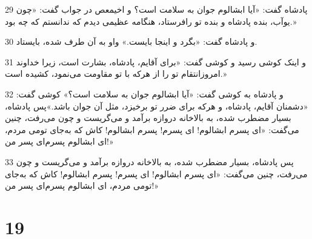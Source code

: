 \par 29 پادشاه گفت: «آیا ابشالوم جوان به سلامت است؟ و اخیمعص در جواب گفت: «چون یوآب، بنده پادشاه و بنده تو رافرستاد، هنگامه عظیمی دیدم که ندانستم که چه بود.»
\par 30 و پادشاه گفت: «بگرد و اینجا بایست.» واو به آن طرف شده، بایستاد.
\par 31 و اینک کوشی رسید و کوشی گفت: «برای آقایم، پادشاه، بشارت است، زیرا خداوند امروزانتقام تو را از هر‌که با تو مقاومت می‌نمود، کشیده است.»
\par 32 و پادشاه به کوشی گفت: «آیا ابشالوم جوان به سلامت است؟» کوشی گفت: «دشمنان آقایم، پادشاه، و هر‌که برای ضرر تو برخیزد، مثل آن جوان باشد.»پس پادشاه، بسیار مضطرب شده، به بالاخانه دروازه برآمد و می‌گریست و چون می‌رفت، چنین می‌گفت: «ای پسرم ابشالوم! ای پسرم! پسرم ابشالوم! کاش که به‌جای تومی مردم، ای ابشالوم پسرم‌ای پسر من!»
\par 33 پس پادشاه، بسیار مضطرب شده، به بالاخانه دروازه برآمد و می‌گریست و چون می‌رفت، چنین می‌گفت: «ای پسرم ابشالوم! ای پسرم! پسرم ابشالوم! کاش که به‌جای تومی مردم، ای ابشالوم پسرم‌ای پسر من!»
 
\chapter{19}

